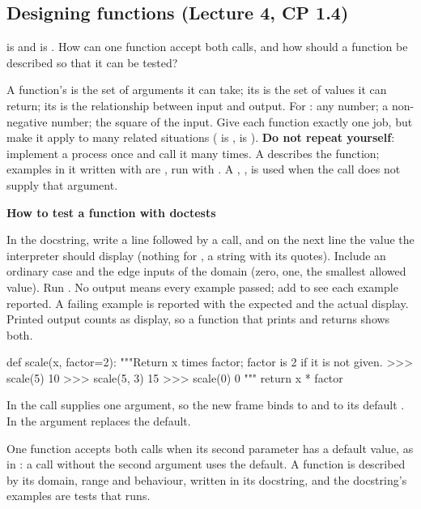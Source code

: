 \documentclass[10pt]{scrartcl}
\newenvironment{howto}[1]{\begin{mdframed}[style=howtostyle]{\color{NavyBlue}\textbf{#1}}\par\vspace{2pt}}{\end{mdframed}}
\begin{document}
\subsection{Designing functions (Lecture 4, CP 1.4)}
\begin{qbox}
   is  and  is . How can one function accept both calls, and how should a function be described so that it can be tested?
\end{qbox}
\begin{itemize}
  \ii A function's  is the set of arguments it can take; its  is the set of values it can return; its  is the relationship between input and output. For : any number; a non-negative number; the square of the input.
  \ii Give each function exactly one job, but make it apply to many related situations ( is ,  is ).
  \ii \textbf{Do not repeat yourself}: implement a process once and call it many times.
  \ii A  describes the function; examples in it written with \cd{>{}>{}>} are , run with .
  \ii A , , is used when the call does not supply that argument.
\end{itemize}
\begin{howto}{How to test a function with doctests}
\begin{steps}
  \ii In the docstring, write a line \cd{>{}>{}>} followed by a call, and on the next line the value the interpreter should display (nothing for , a string with its quotes).
  \ii Include an ordinary case and the edge inputs of the domain (zero, one, the smallest allowed value).
  \ii Run . No output means every example passed; add  to see each example reported.
  \ii A failing example is reported with the expected and the actual display. Printed output counts as display, so a function that prints and returns shows both.
\end{steps}
\end{howto}
\begin{example*}
\begin{py}
def scale(x, factor=2):
    """Return x times factor; factor is 2 if it is not given.
    >>> scale(5)
    10
    >>> scale(5, 3)
    15
    >>> scale(0)
    0
    """
    return x * factor
\end{py}
In  the call supplies one argument, so the new frame binds  to  and  to its default . In  the argument  replaces the default.
\end{example*}
\revisit One function accepts both calls when its second parameter has a default value, as in : a call without the second argument uses the default. A function is described by its domain, range and behaviour, written in its docstring, and the docstring's \cd{>{}>{}>} examples are tests that  runs.
\end{document}
